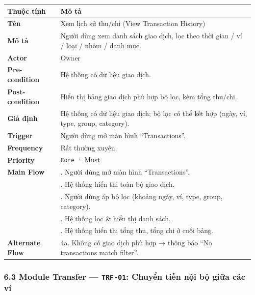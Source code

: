 \documentclass[11pt,a4paper]{article}
\newcounter{none}
\newcommand{\faintline}{\noalign{\global\arrayrulecolor{faintgray}}\hline\noalign{\global\arrayrulecolor{black}}} %
\begin{document}
{\def\LTcaptype{none}
\begin{longtable}[]{@{}
  >{\raggedright\arraybackslash}p{}
  >{\raggedright\arraybackslash}p{}@{}}
\toprule\noalign{}
\begin{minipage}[b]{\linewidth}\raggedright
Thuộc tính
\end{minipage} & \begin{minipage}[b]{\linewidth}\raggedright
Mô tả
\end{minipage} \\
\midrule\noalign{}
\endhead
\bottomrule\noalign{}
\endlastfoot
\textbf{Tên} & Xem lịch sử thu/chi (View Transaction History) \\ \faintline
\textbf{Mô tả} & Người dùng xem danh sách giao dịch, lọc theo thời gian / ví / loại / nhóm / danh mục. \\ \faintline
\textbf{Actor} & Owner \\ \faintline
\textbf{Pre-condition} & Hệ thống có dữ liệu giao dịch. \\ \faintline
\textbf{Post-condition} & Hiển thị bảng giao dịch phù hợp bộ lọc, kèm tổng thu/chi. \\ \faintline
\textbf{Giả định} & Hệ thống có dữ liệu giao dịch; bộ lọc có thể kết hợp (ngày, ví, type, group, category). \\ \faintline
\textbf{Trigger} & Người dùng mở màn hình ``Transactions''. \\ \faintline
\textbf{Frequency} & Rất thường xuyên. \\ \faintline
\textbf{Priority} & \texttt{Core} · Must \\ \faintline
\textbf{Main Flow} & 1. Người dùng mở màn hình ``Transactions''.\\
&2. Hệ thống hiển thị toàn bộ giao dịch.\\
&3. Người dùng áp bộ lọc (khoảng ngày, ví, type, group, category).\\
&4. Hệ thống lọc \& hiển thị danh sách.\\
&5. Hệ thống hiển thị tổng thu, tổng chi ở cuối bảng. \\ \faintline
\textbf{Alternate Flow} & 4a. Không có giao dịch phù hợp → thông báo ``No transactions match filter''. \\
\end{longtable}
}

\subsubsection{\texorpdfstring{6.3 Module Transfer --- \texttt{TRF-01}: Chuyển tiền nội bộ giữa các ví}{6.3 Module Transfer --- TRF-01: Chuyển tiền nội bộ giữa các ví}}\label{module-transfer-trf-01-chuyux1ec3n-tiux1ec1n-nux1ed9i-bux1ed9-giux1eefa-cuxe1c-vuxed}
\end{document}
